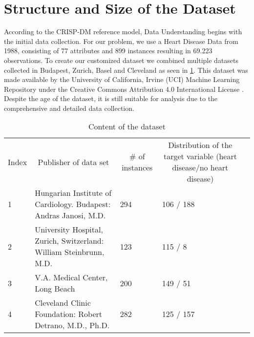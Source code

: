 \section{Structure and Size of the Dataset} \label{sec:dataUnderstanding}


According to the CRISP-DM reference model, Data Understanding begins with the initial data collection. For our problem, we use a Heart Disease Data from 1988, consisting of 77 attributes and 899 instances resulting in 69.223 observations. To create our customized dataset we combined multiple datasets collected in Budapest, Zurich, Basel and Cleveland as seen in \cref{table:datasets}. This dataset was made available by the University of California, Irvine (UCI) Machine Learning Repository under the Creative Commons Attribution 4.0 International License \citep{janosi1988}. Despite the age of the dataset, it is still suitable for analysis due to the comprehensive and detailed data collection. 

\begin{table}[] 
\begin{tabular}{l|l|l|l|l} 
Index & \multicolumn{1}{c}{Publisher of data set}                          & \multicolumn{1}{c}{\# of instances} & \multicolumn{1}{c}{Distribution of the target variable (heart disease/no heart disease)} &  \\
1     & Hungarian Institute of Cardiology. Budapest: Andras Janosi, M.D.   & 294                                 & 106 / 188                                                                                &  \\
2     & University Hospital, Zurich, Switzerland: William Steinbrunn, M.D. & 123                                 & 115 / 8                                                                                  &  \\
3     & V.A. Medical Center, Long Beach                                    & 200                                 & 149 / 51                                                                                 &  \\
4     & Cleveland Clinic Foundation: Robert Detrano, M.D., Ph.D.           & 282                                 & 125 / 157                                                                                & 
\end{tabular}
\caption{Content of the dataset} 
\label{table:datasets}
\end{table}

